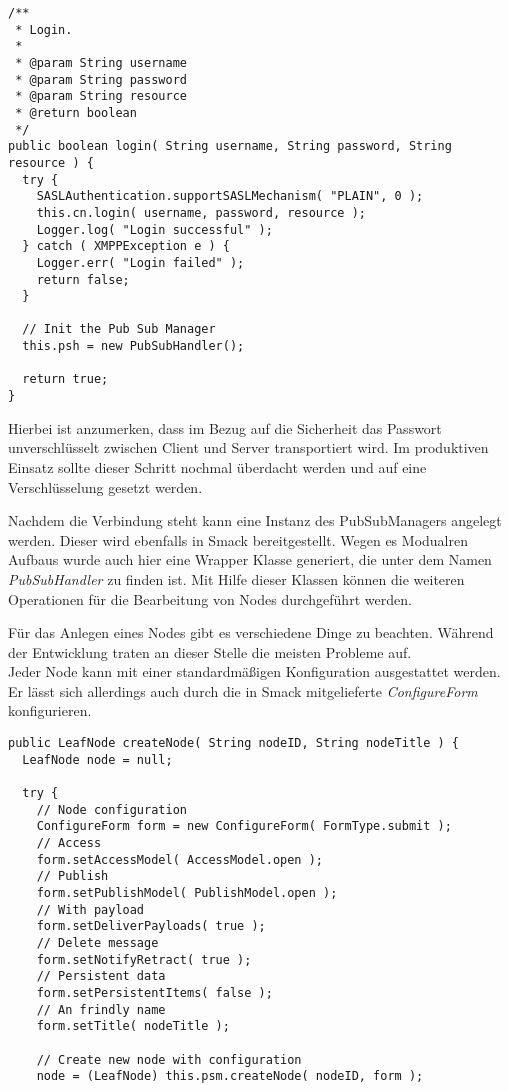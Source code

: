 \begin{lstlisting}[label=xmpplogin,caption=Auszug aus ConnectionHandler für den Login]
/**
 * Login.
 *
 * @param String username
 * @param String password
 * @param String resource
 * @return boolean
 */
public boolean login( String username, String password, String resource ) {
  try {
    SASLAuthentication.supportSASLMechanism( "PLAIN", 0 );
    this.cn.login( username, password, resource );
    Logger.log( "Login successful" );
  } catch ( XMPPException e ) {
    Logger.err( "Login failed" );
    return false;
  }

  // Init the Pub Sub Manager
  this.psh = new PubSubHandler();

  return true;
}
\end{lstlisting}

Hierbei ist anzumerken, dass im Bezug auf die Sicherheit das Passwort unverschlüsselt zwischen Client und Server transportiert wird. Im produktiven Einsatz sollte dieser Schritt nochmal überdacht werden und auf eine Verschlüsselung gesetzt werden.

\vspace{0.2cm}

Nachdem die Verbindung steht kann eine Instanz des PubSubManagers angelegt werden. Dieser wird ebenfalls in Smack bereitgestellt. Wegen es Modualren Aufbaus wurde auch hier eine Wrapper Klasse generiert, die unter dem Namen \textit{PubSubHandler} zu finden ist. Mit Hilfe dieser Klassen können die weiteren Operationen für die Bearbeitung von Nodes durchgeführt werden.

\vspace{0.2cm}

Für das Anlegen eines Nodes gibt es verschiedene Dinge zu beachten. Während der Entwicklung traten an dieser Stelle die meisten Probleme auf.\\

Jeder Node kann mit einer standardmäßigen Konfiguration ausgestattet werden. Er lässt sich allerdings auch durch die in Smack mitgelieferte \textit{ConfigureForm} konfigurieren.

\begin{lstlisting}[label=xmppnodecreate,caption=Auszug aus PubSubHandler.createNode() für das Anlegen eines Nodes]
public LeafNode createNode( String nodeID, String nodeTitle ) {
  LeafNode node = null;

  try {
    // Node configuration
    ConfigureForm form = new ConfigureForm( FormType.submit );
    // Access
    form.setAccessModel( AccessModel.open );
    // Publish
    form.setPublishModel( PublishModel.open );
    // With payload
    form.setDeliverPayloads( true );
    // Delete message
    form.setNotifyRetract( true );
    // Persistent data
    form.setPersistentItems( false );
    // An frindly name
    form.setTitle( nodeTitle );

    // Create new node with configuration
    node = (LeafNode) this.psm.createNode( nodeID, form );
\end{lstlisting}

